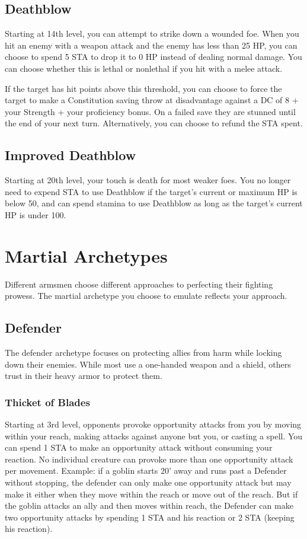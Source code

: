 \subsection{Deathblow}
Starting at 14th level, you can attempt to strike down a wounded foe. When you hit an enemy with a weapon attack and the enemy has less than 25 HP, you can choose to spend 5 STA to drop it to 0 HP instead of dealing normal damage. You can choose whether this is lethal or nonlethal if you hit with a melee attack.

If the target has hit points above this threshold, you can choose to force the target to make a Constitution saving throw at disadvantage against a DC of 8 + your Strength + your proficiency bonus. On a failed save they are stunned until the end of your next turn. Alternatively, you can choose to refund the STA spent.

\subsection{Improved Deathblow}
Starting at 20th level, your touch is death for most weaker foes. You no longer need to expend STA to use Deathblow if the target's current or maximum HP is below 50, and can spend stamina to use Deathblow as long as the target's current HP is under 100.

\section{Martial Archetypes}

Different armsmen choose different approaches to perfecting their fighting prowess. The martial archetype you choose to emulate reflects your approach.

\subsection{Defender}
The defender archetype focuses on protecting allies from harm while locking down their enemies. While most use a one-handed weapon and a shield, others trust in their heavy armor to protect them.

\subsubsection{Thicket of Blades}
Starting at 3rd level, opponents provoke opportunity attacks from you by moving within your reach, making attacks against anyone but you, or casting a spell. You can spend 1 STA to make an opportunity attack without consuming your reaction. No individual creature can provoke more than one opportunity attack per movement. Example: if a goblin starts 20' away and runs past a Defender without stopping, the defender can only make one opportunity attack but may make it either when they move within the reach or move out of the reach. But if the goblin attacks an ally and then moves within reach, the Defender can make two opportunity attacks by spending 1 STA and his reaction or 2 STA (keeping his reaction). 

